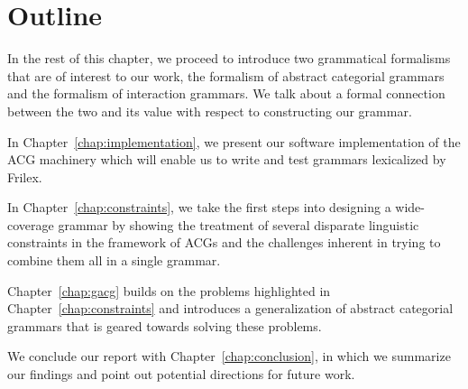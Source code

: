 \section{Outline}

In the rest of this chapter, we proceed to introduce two grammatical
formalisms that are of interest to our work, the formalism of abstract
categorial grammars and the formalism of interaction grammars. We talk
about a formal connection between the two and its value with respect to
constructing our grammar.

In Chapter~\ref{chap:implementation}, we present our software
implementation of the ACG machinery which will enable us to write and
test grammars lexicalized by Frilex.

In Chapter~\ref{chap:constraints}, we take the first steps into
designing a wide-coverage grammar by showing the treatment of several
disparate linguistic constraints in the framework of ACGs and the
challenges inherent in trying to combine them all in a single grammar.

Chapter~\ref{chap:gacg} builds on the problems highlighted in
Chapter~\ref{chap:constraints} and introduces a generalization of
abstract categorial grammars that is geared towards solving these
problems.

We conclude our report with Chapter~\ref{chap:conclusion}, in which we
summarize our findings and point out potential directions for future
work.
